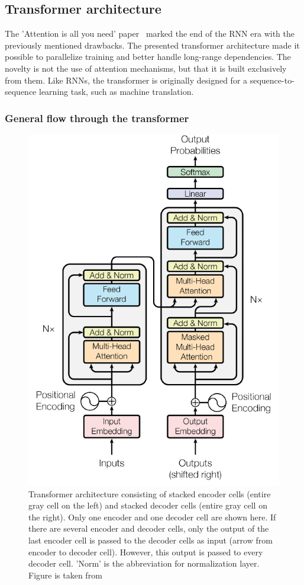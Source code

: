 \documentclass[a4paper]{scrartcl}
\begin{document}
    \subsection{Transformer architecture}\label{subsec:transformer-architecture}
    The 'Attention is all you need' paper~\cite{vaswani2017attention} marked the end of the RNN era with the previously mentioned drawbacks.
    The presented transformer architecture made it possible to parallelize training and better handle long-range dependencies.
    The novelty is not the use of attention mechanisms, but that it is built exclusively from them.
    Like RNNs, the transformer is originally designed for a sequence-to-sequence learning task, such as machine translation.

    \subsubsection{General flow through the transformer}
    \begin{figure}[btp]
        \centering
        \includegraphics[width=0.75\linewidth]{img/TransformerModelArchitecture}
        \caption[Transformer architecture]{Transformer architecture consisting of stacked encoder cells (entire gray cell on the left) and stacked decoder cells (entire gray cell on the right).
        Only one encoder and one decoder cell are shown here.
        If there are several encoder and decoder cells, only the output of the last encoder cell is passed to the decoder cells as input (arrow from encoder to decoder cell).
        However, this output is passed to every decoder cell.
        'Norm' is the abbreviation for normalization layer.
        Figure is taken from~\cite{vaswani2017attention}}
        \label{fig:transformer-architecture}
    \end{figure}
\end{document}

